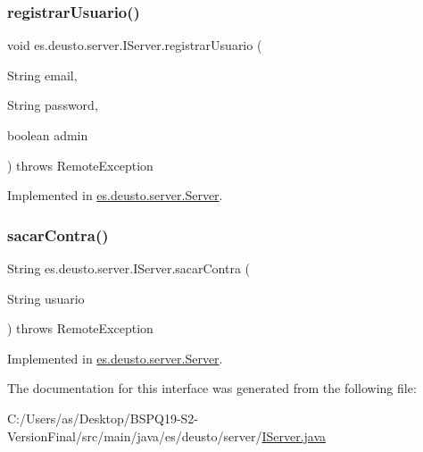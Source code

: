 \subsubsection{\texorpdfstring{registrarUsuario()}{registrarUsuario()}}
{\footnotesize\ttfamily void es.\+deusto.\+server.\+I\+Server.\+registrar\+Usuario (\begin{DoxyParamCaption}\item[{String}]{email,  }\item[{String}]{password,  }\item[{boolean}]{admin }\end{DoxyParamCaption}) throws Remote\+Exception}



Implemented in \mbox{\hyperlink{classes_1_1deusto_1_1server_1_1_server_a0f79b8db6904facdae94410e26bef452}{es.\+deusto.\+server.\+Server}}.

\mbox{\label{interfacees_1_1deusto_1_1server_1_1_i_server_a950b819a4f67edf0ef76221dd4714d47}} 
\subsubsection{\texorpdfstring{sacarContra()}{sacarContra()}}
{\footnotesize\ttfamily String es.\+deusto.\+server.\+I\+Server.\+sacar\+Contra (\begin{DoxyParamCaption}\item[{String}]{usuario }\end{DoxyParamCaption}) throws Remote\+Exception}



Implemented in \mbox{\hyperlink{classes_1_1deusto_1_1server_1_1_server_aefe051d880626950ea2964d89a4ae3c3}{es.\+deusto.\+server.\+Server}}.



The documentation for this interface was generated from the following file\+:\begin{DoxyCompactItemize}
\item 
C\+:/\+Users/as/\+Desktop/\+B\+S\+P\+Q19-\/\+S2-\/\+Version\+Final/src/main/java/es/deusto/server/\mbox{\hyperlink{_i_server_8java}{I\+Server.\+java}}\end{DoxyCompactItemize}
